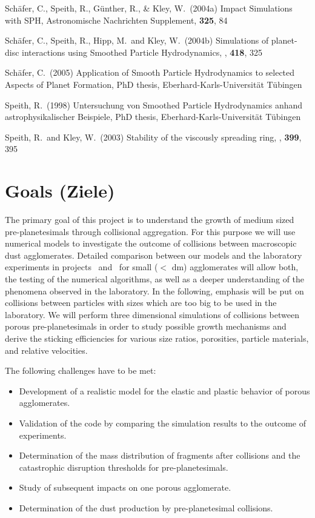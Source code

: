 \begin{ownpubl}
\item Sch{\"a}fer, C., Speith, R., G{\"u}nther, R., \& Kley, W.\ (2004a)
   Impact Simulations with SPH,
   Astronomische Nachrichten Supplement, {\bf 325}, 84
\item
Sch\"afer, C., Speith, R., Hipp, M.~and Kley, W.\ (2004b) Simulations of
planet-disc interactions using Smoothed Particle Hydrodynamics, \aap,
\textbf{418}, 325
\item Sch\"afer, C.~(2005) Application of Smooth
Particle Hydrodynamics to selected Aspects of Planet Formation, PhD
thesis, Eberhard-Karls-Universit\"at T\"ubingen
\item Speith, R.~(1998) Untersuchung von Smoothed Particle
   Hydrodynamics anhand astrophysikalischer Beispiele, PhD
thesis, Eberhard-Karls-Universit\"at T\"ubingen
\item Speith, R.~and Kley, W.~(2003) Stability of the viscously spreading ring, \aap,
\textbf{399}, 395
\end{ownpubl}
%
%
\section{Goals (Ziele)}
%

The primary goal of this project is to understand the growth of medium sized
pre-planetesimals through collisional aggregation.  For this purpose we will
use numerical models to investigate the outcome of collisions between
macroscopic dust agglomerates.  Detailed comparison between our models and
the laboratory experiments in projects \projwurm\ and \projblumtrie\ for
small ($<$ dm) agglomerates will allow both, the testing of the numerical
algorithms, as well as a deeper understanding of the phenomena observed in
the laboratory.  In the following, emphasis will be put on collisions
between particles with sizes which are too big to be used in the laboratory.
We will perform three dimensional simulations of collisions between porous
pre-planetesimals in order to study possible growth mechanisms and derive
the sticking efficiencies for various size ratios, porosities, particle
materials, and relative velocities.

\noindent
The following challenges have to be met:
%
\begin{itemize}
\item Development of a realistic model for the elastic and plastic
behavior of porous agglomerates.
\item Validation of the code by comparing the simulation results to  
the outcome of experiments.
\item Determination of the mass distribution of fragments after
collisions and the catastrophic disruption thresholds for
pre-planetesimals.
\item Study of subsequent impacts on one porous agglomerate.
\item Determination of the dust production by pre-planetesimal  
collisions.
\end{itemize}


